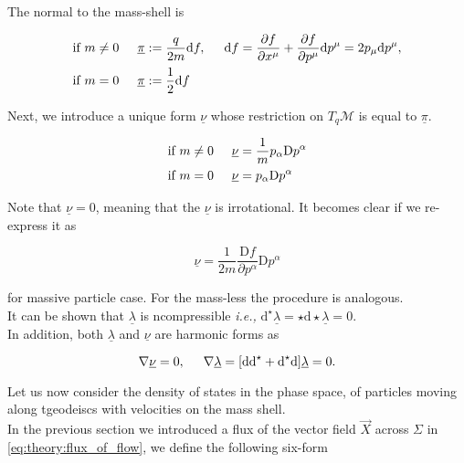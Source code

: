 \documentclass[11pt,a4paper,headinclude=true,DIV=14,BCOR=8mm,chapterprefix,listof=totoc,twoside,openright,abstracton]{scrbook}
\begin{document}
The normal to the mass-shell is 

\begin{align}
    \text{if } m &\neq 0 \hspace{5mm} \underline{\pi}:=\frac{q}{2m}\text{d}f, \hspace{5mm} \text{d}f = \frac{\partial f}{\partial x^{\mu}} + \frac{\partial f}{\partial p^{\mu}}\text{d}p^{\mu} = 2p_{\mu}\text{d}p^{\mu}, \\
    \text{if } m &= 0 \hspace{5mm} \underline{\pi}:=\frac{1}{2}\text{d}f
\end{align}

Next, we introduce a unique form $\underline{\nu}$ whose restriction on $T_q\mathcal{M}$ is equal to $\underline{\pi}$. 

\begin{align}
    \text{if } m &\neq 0 \hspace{5mm} \underline{\nu} = \frac{1}{m}p_{\alpha}\text{D}p^{\alpha} \\
    \text{if } m &= 0 \hspace{5mm} \underline{\nu} = p_{\alpha}\text{D}p^{\alpha}
\end{align} 

Note that $\underline{\nu} = 0$, meaning that the $\underline{\nu}$ is irrotational. It becomes clear if we re-express it as 

\begin{equation}
    \underline{\nu} = \frac{1}{2m}\frac{\text{D}f}{\partial p^{\alpha}}\text{D}p^{\alpha}
\end{equation} 

for massive particle case. For the mass-less the procedure is analogous. \\

It can be shown that $\underline{\lambda}$ is ncompressible \textit{i.e.,} $\text{d}^{\star}\underline{\lambda} =\star \text{d}\star\underline{\lambda} =0$. \\

In addition, both $\underline{\lambda}$ and $\underline{\nu}$ are harmonic forms as 

\begin{equation}
    \nabla\underline{\nu} = 0 , \hspace{5mm}
    \nabla\underline{\lambda} = [\text{dd}^{\star} + \text{d}^{\star}\text{d}]\underline{\lambda} = 0.
\end{equation}

Let us now consider the density of states in the phase space, of particles moving along tgeodeiscs with velocities on the mass shell. \\ 
In the previous section we introduced a flux of the vector field $\vec{X}$ across $\Sigma$ in \ref{eq:theory:flux_of_flow}, we define the following six-form
\end{document}
